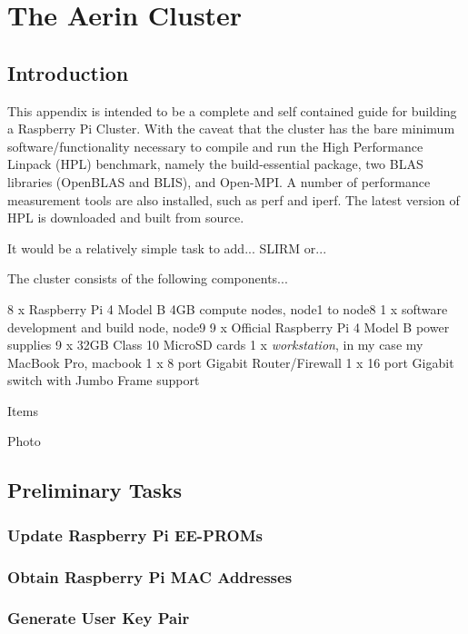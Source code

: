 \documentclass{report}
\begin{document}
\chapter{The Aerin Cluster}

\section{Introduction}

This appendix is intended to be a complete and self contained guide for building a Raspberry Pi Cluster. With the caveat that the cluster has the bare minimum software/functionality necessary to compile and run the High Performance Linpack (HPL) benchmark, namely the build-essential package, two BLAS libraries (OpenBLAS and BLIS), and Open-MPI. A number of performance measurement tools are also installed, such as perf and iperf. The latest version of HPL is downloaded and built from source.

It would be a relatively simple task to add... SLIRM or...

The cluster consists of the following components...

8 x Raspberry Pi 4 Model B 4GB compute nodes, node1 to node8
1 x software development and build node, node9
9 x Official Raspberry Pi 4 Model B power supplies
9 x 32GB Class 10 MicroSD cards
1 x \emph{workstation}, in my case my MacBook Pro, macbook
1 x 8 port Gigabit Router/Firewall
1 x 16 port Gigabit switch with Jumbo Frame support

Items

Photo


\clearpage\section{Preliminary Tasks}


\subsection{Update Raspberry Pi EE-PROMs}



\subsection{Obtain Raspberry Pi MAC Addresses}



\subsection{Generate User Key Pair}
\end{document}
